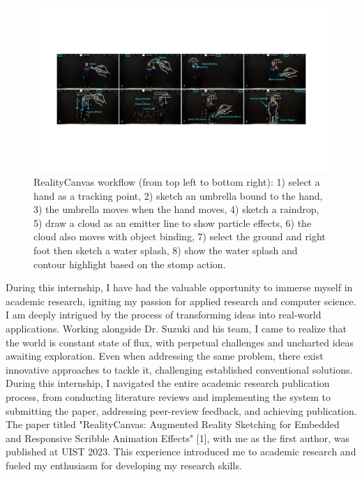 \documentclass{article}
\def\system{RealityCanvas}
\begin{document}
\begin{figure}[h!]
  \centering
  \includegraphics[width=\textwidth]{figures/teaser-num.pdf}
  \caption{\system{} workflow (from top left to bottom right): 1) select a hand as a tracking point, 2) sketch an umbrella bound to the hand, 3) the umbrella moves when the hand moves, 4) sketch a raindrop, 5) draw a cloud as an emitter line to show particle effects, 6) the cloud also moves with object binding, 7) select the ground and right foot then sketch a water splash, 8) show the water splash and contour highlight based on the stomp action.}
  \label{fig:teaser}
\end{figure}


During this internship, I have had the valuable opportunity to immerse myself in academic research, igniting my passion for 
applied research and computer science. I am deeply intrigued by the process of transforming ideas into real-world applications.
Working alongside Dr. Suzuki and his team, I came to realize that the world is constant state of flux, with perpetual challenges 
and uncharted ideas awaiting exploration. Even when addressing the same problem, there exist innovative approaches to tackle it, 
challenging established conventional solutions. During this internship, I navigated the entire academic research publication process, 
from conducting literature reviews and implementing the system to submitting the paper, 
addressing peer-review feedback, and achieving publication. 
The paper titled "RealityCanvas: Augmented Reality Sketching for Embedded and Responsive Scribble Animation Effects" [1], 
with me as the first author, was published at UIST 2023. This experience introduced me to academic research and fueled my enthusiasm 
for developing my research skills.
\end{document}
